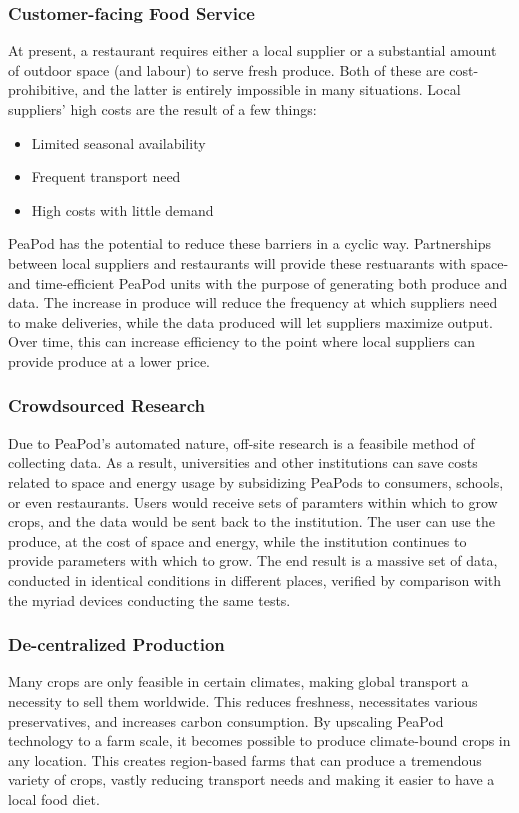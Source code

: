 \documentclass{report}
\begin{document}
\subsubsection{Customer-facing Food Service} %
At present, a restaurant requires either a local supplier or a substantial amount of outdoor space (and labour) to serve fresh produce. Both of these are cost-prohibitive, and the latter is entirely impossible in many situations. Local suppliers' high costs are the result of a few things:
\begin{itemize}
    \item Limited seasonal availability
    \item Frequent transport need
    \item High costs with little demand
\end{itemize}
PeaPod has the potential to reduce these barriers in a cyclic way. Partnerships between local suppliers and restaurants will provide these restuarants with space- and time-efficient PeaPod units with the purpose of generating both produce and data. The increase in produce will reduce the frequency at which suppliers need to make deliveries, while the data produced will let suppliers maximize output. Over time, this can increase efficiency to the point where local suppliers can provide produce at a lower price.

\subsubsection{Crowdsourced Research} %
Due to PeaPod's automated nature, off-site research is a feasibile method of collecting data. As a result, universities and other institutions can save costs related to space and energy usage by subsidizing PeaPods to consumers, schools, or even restaurants. Users would receive sets of paramters within which to grow crops, and the data would be sent back to the institution. The user can use the produce, at the cost of space and energy, while the institution continues to provide parameters with which to grow. The end result is a massive set of data, conducted in identical conditions in different places, verified by comparison with the myriad devices conducting the same tests.

\subsubsection{De-centralized Production} %
Many crops are only feasible in certain climates, making global transport a necessity to sell them worldwide. This reduces freshness, necessitates various preservatives, and increases carbon consumption. By upscaling PeaPod technology to a farm scale, it becomes possible to produce climate-bound crops in any location. This creates region-based farms that can produce a tremendous variety of crops, vastly reducing transport needs and making it easier to have a local food diet.
\end{document}

